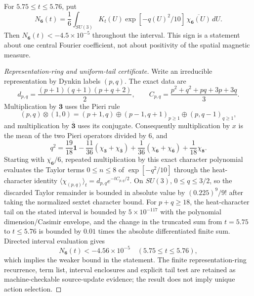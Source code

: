 \documentclass[12pt,a4paper]{article}
\begin{document}
\begin{proposition}
\label{p13:prop:v3025-sextet-character-certificate}
For $5.75\le t\le5.76$, put
\[
 N_{\mathbf6}(t)=\frac16\int_{SU(3)} K_t(U)
 \exp[-q(U)^2/10] \,\overline{\chi_{\mathbf6}(U)}\,dU.
\]
Then $N_{\mathbf6}(t)<-4.5\times10^{-5}$ throughout the interval.
This sign is a statement about one central Fourier coefficient, not
about positivity of the spatial magnetic measure.
\end{proposition}
\begin{proof}[Representation-ring and uniform-tail certificate]
Write an irreducible representation by Dynkin labels $(p,q)$.
The exact data are
\[
 d_{p,q}=\frac{(p+1)(q+1)(p+q+2)}2,\qquad
 C_{p,q}=\frac{p^2+q^2+pq+3p+3q}{3}.
\]
Multiplication by $\mathbf3$ uses the Pieri rule
\[
 (p,q)\otimes(1,0)
 =(p+1,q)\oplus(p-1,q+1)_{p\ge1}\oplus(p,q-1)_{q\ge1},
\]
and multiplication by $\overline{\mathbf3}$ uses its conjugate.
Consequently multiplication by $x$ is the mean of the two Pieri
operators divided by $6$, and
\[
 \boxed{q^2=\frac{19}{18}\mathbf1
 -\frac{11}{36}(\chi_{\mathbf3}+\chi_{\overline{\mathbf3}})
 +\frac1{36}(\chi_{\mathbf6}+\chi_{\overline{\mathbf6}})
 +\frac1{18}\chi_{\mathbf8}.}
\]
Starting with $\overline{\chi_{\mathbf6}}/6$, repeated
multiplication by this exact character polynomial evaluates the
Taylor terms $0\le n\le8$ of
$\exp[-q^2/10]$ through the heat-character identity
$\langle\chi_{(p,q)}\rangle_t=d_{p,q}e^{-tC_{p,q}/2}$.
On $SU(3)$, $0\le q\le3/2$, so the discarded Taylor remainder is
bounded in absolute value by
$(0.225)^9/9!$ after taking the normalized sextet character bound.
For $p+q\ge18$, the heat-character tail on the stated interval is
bounded by $5\times10^{-117}$ with the polynomial dimension/Casimir
envelope, and the change in the truncated sum from $t=5.75$ to
$t\le5.76$ is bounded by $0.01$ times the absolute differentiated
finite sum.  Directed interval evaluation gives
\[
 \boxed{N_{\mathbf6}(t)<-4.56\times10^{-5}
 \quad(5.75\le t\le5.76),}
\]
which implies the weaker bound in the statement.  The finite
representation-ring recurrence, term list, interval enclosures and
explicit tail test are retained as machine-checkable source-update
evidence; the result does not imply unique action selection.
\end{proof}


\end{document}
